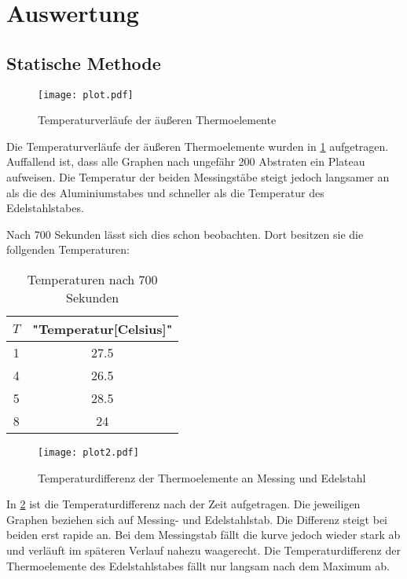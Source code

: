\section{Auswertung}
\label{sec:Auswertung}
\subsection{Statische Methode}
\begin{figure}
  \centering
  \texttt{[image: plot.pdf]}
  \caption{Temperaturverläufe der äußeren Thermoelemente}
  \label{fig:plot}
\end{figure}
Die Temperaturverläufe der äußeren Thermoelemente wurden in \ref{fig:plot} aufgetragen.
Auffallend ist, dass alle Graphen nach ungefähr 200 Abstraten ein Plateau aufweisen.
Die Temperatur der beiden Messingstäbe steigt jedoch langsamer an als die des Aluminiumstabes und schneller als die Temperatur des Edelstahlstabes.


Nach 700 Sekunden lässt sich dies schon beobachten.
Dort besitzen sie die follgenden Temperaturen:
\begin{table}
  \centering
  \caption{Temperaturen nach 700 Sekunden}
    \label{tab:t_1}
    \begin{tabular}{c c}
      \toprule
       $T$ & "Temperatur[Celsius]" \\
      \midrule
      1 & 27.5 \\
      4 & 26.5 \\
      5 & 28.5 \\
      8 & 24 \\
      \bottomrule
    \end{tabular}
\end{table}
\begin{figure}
  \centering
  \texttt{[image: plot2.pdf]}
  \caption{Temperaturdifferenz der Thermoelemente an Messing und Edelstahl}
  \label{fig:plot2}
\end{figure}


In \ref{fig:plot2} ist die Temperaturdifferenz nach der Zeit aufgetragen.
Die jeweiligen Graphen beziehen sich auf Messing- und Edelstahlstab.
Die Differenz steigt bei beiden erst rapide an.
Bei dem Messingstab fällt die kurve jedoch wieder stark ab und verläuft im späteren Verlauf nahezu waagerecht.
Die Temperaturdifferenz der Thermoelemente des Edelstahlstabes fällt nur langsam nach dem Maximum ab.
